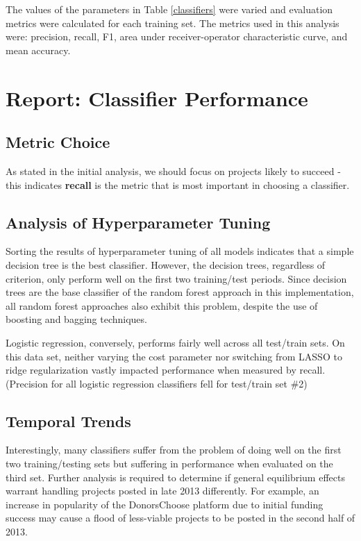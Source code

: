\documentclass[11pt]{article}
\begin{document}
The values of the parameters in Table \ref{classifiers} were varied and evaluation metrics were calculated for each training set. The metrics used in this analysis were: precision, recall, F1, area under receiver-operator characteristic curve, and mean accuracy.

\section{Report: Classifier Performance}
\subsection{Metric Choice}
As stated in the initial analysis, we should focus on projects likely to succeed - this indicates \textbf{recall} is the metric that is most important in choosing a classifier.

\subsection{Analysis of Hyperparameter Tuning}
Sorting the results of hyperparameter tuning of all models indicates that a simple decision tree is the best classifier. However, the decision trees, regardless of criterion, only perform well on the first two training/test periods. Since decision trees are the base classifier of the random forest approach in this implementation, all random forest approaches also exhibit this problem, despite the use of boosting and bagging techniques.

Logistic regression, conversely, performs fairly well across all test/train sets. On this data set, neither varying the cost parameter nor switching from LASSO to ridge regularization vastly impacted performance when measured by recall. (Precision for all logistic regression classifiers fell for test/train set \#2)

\subsection{Temporal Trends}
Interestingly, many classifiers suffer from the problem of doing well on the first two training/testing sets but suffering in performance when evaluated on the third set. Further analysis is required to determine if general equilibrium effects warrant handling projects posted in late 2013 differently. For example, an increase in popularity of the DonorsChoose platform due to initial funding success may cause a flood of less-viable projects to be posted in the second half of 2013.
\end{document}
